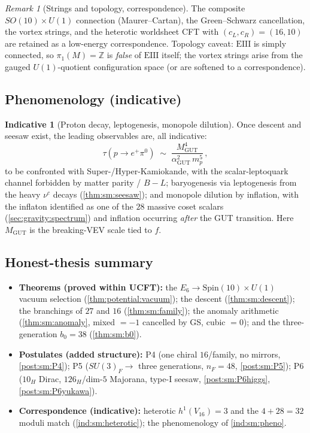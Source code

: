 \documentclass[11pt]{article}
\theoremstyle{plain}
\theoremstyle{definition}
\newtheorem{indicative}[theorem]{Indicative}
\theoremstyle{remark}
\newtheorem{remark}[theorem]{Remark}
\begin{document}
\begin{remark}[Strings and topology, correspondence]\label{rem:sm:strings}
The composite $SO(10)\times U(1)$ connection (Maurer--Cartan), the Green--Schwarz
cancellation, the vortex strings, and the heterotic worldsheet CFT with
$(c_L,c_R)=(16,10)$ are retained as a low-energy correspondence. Topology caveat:
$\mathrm{EIII}$ is simply connected, so $\pi_1(M)=\mathbb{Z}$ is \emph{false} of
$\mathrm{EIII}$ itself; the vortex strings arise from the gauged $U(1)$-quotient
configuration space (or are softened to a correspondence).
\end{remark}

\subsection{Phenomenology (indicative)}
\label{sec:sm:pheno}
\label{sec:pheno:main}

\begin{indicative}[Proton decay, leptogenesis, monopole dilution]\label{ind:sm:pheno}
Once descent and seesaw exist, the leading observables are, all indicative:
\begin{equation}\label{eq:sm:proton}
\tau(p\to e^+\pi^0)\;\sim\;\frac{M_{\mathrm{GUT}}^4}{\alpha_{\mathrm{GUT}}^2\,m_p^5}\,,
\end{equation}
to be confronted with Super-/Hyper-Kamiokande, with the scalar-leptoquark channel
forbidden by matter parity / $B\!-\!L$; baryogenesis via leptogenesis from the heavy
$\nu^c$ decays (\autoref{thm:sm:seesaw}); and monopole dilution by inflation, with the
inflaton identified as one of the $28$ massive coset scalars
(\autoref{sec:gravity:spectrum}) and inflation occurring \emph{after} the GUT
transition. Here $M_{\mathrm{GUT}}$ is the breaking-VEV scale tied to $f$.
\end{indicative}

\subsection{Honest-thesis summary}
\label{sec:sm:honest}

\begin{itemize}
\item \textbf{Theorems (proved within UCFT):} the $E_6\to\mathrm{Spin}(10)\times U(1)$
vacuum selection (\autoref{thm:potential:vacuum}); the descent
(\autoref{thm:sm:descent}); the branchings of $27$ and $16$
(\autoref{thm:sm:family}); the anomaly arithmetic
(\autoref{thm:sm:anomaly}, mixed $=-1$ cancelled by GS, cubic $=0$); and the
three-generation $b_0=38$ (\autoref{thm:sm:b0}).
\item \textbf{Postulates (added structure):} P4 (one chiral $16$/family, no mirrors,
\autoref{post:sm:P4}); P5 ($SU(3)_F\to$ three generations, $n_F=48$,
\autoref{post:sm:P5}); P6 ($10_H$ Dirac, $126_H$/dim-$5$ Majorana, type-I seesaw,
\autoref{post:sm:P6higgs}, \autoref{post:sm:P6yukawa}).
\item \textbf{Correspondence (indicative):} heterotic $h^1(V_{16})=3$ and the
$4+28=32$ moduli match (\autoref{ind:sm:heterotic}); the phenomenology of
\autoref{ind:sm:pheno}.
\end{itemize}
\end{document}
